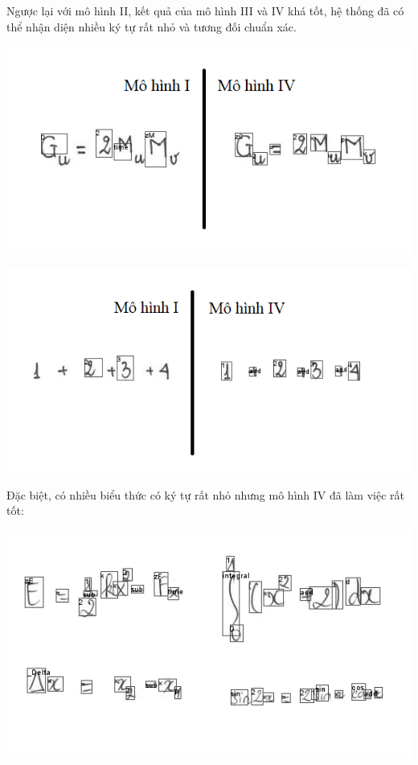 \documentclass[a4paper,12pt]{article}
\begin{document}
	Ngược lại với mô hình II, kết quả của mô hình III và IV khá tốt, hệ thống đã có thể nhận diện nhiều ký tự rất nhỏ và tương đối chuẩn xác.
	
	\begin{center}
		\centering
		\includegraphics[width=0.775\linewidth]{compare_5.png}
		\vspace{0.5cm}
		
	\end{center}
	
	\begin{center}
		\centering
		\includegraphics[width=0.775\linewidth]{compare_6.png}
		\vspace{0.5cm}
		
	\end{center}
	
	Đặc biệt, có nhiều biểu thức có ký tự rất nhỏ nhưng mô hình IV đã làm việc rất tốt:
	
	\begin{center}
		\centering
		\includegraphics{compare_7.png}
		\vspace{0.5cm}
	\end{center}
	
\end{document}
